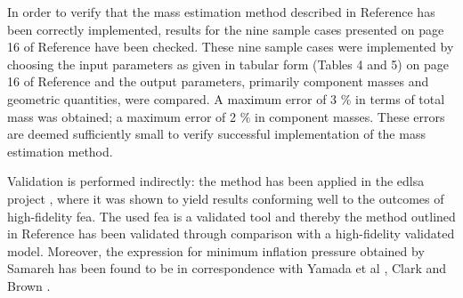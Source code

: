 In order to verify that the mass estimation method described in Reference \cite{Samareh2011} has been correctly implemented, results for the nine sample cases presented on page 16 of Reference \cite{Samareh2011} have been checked. These nine sample cases were implemented by choosing the input parameters as given in tabular form (Tables 4 and 5) on page 16 of Reference \cite{Samareh2011} and the output parameters, primarily component masses and geometric quantities, were compared. A maximum error of 3 $\%$ in terms of total mass was obtained; a maximum error of 2 $\%$ in component masses. These errors are deemed sufficiently small to verify successful implementation of the mass estimation method.

Validation is performed indirectly: the method \cite{Samareh2011} has been applied in the \gls{edlsa} project \cite{Cianciolo2010}, where it was shown to yield results conforming well to the outcomes of high-fidelity \gls{fea}. The used \gls{fea} is a validated tool \cite{Cianciolo2010} and thereby the method outlined in Reference \cite{Samareh2011} has been validated through comparison with a high-fidelity validated model. Moreover, the expression for minimum inflation pressure obtained by Samareh has been found to be in correspondence with Yamada et al \cite{Yamada2009}, Clark \cite{Clark2009} and Brown \cite{Brown2009}.



